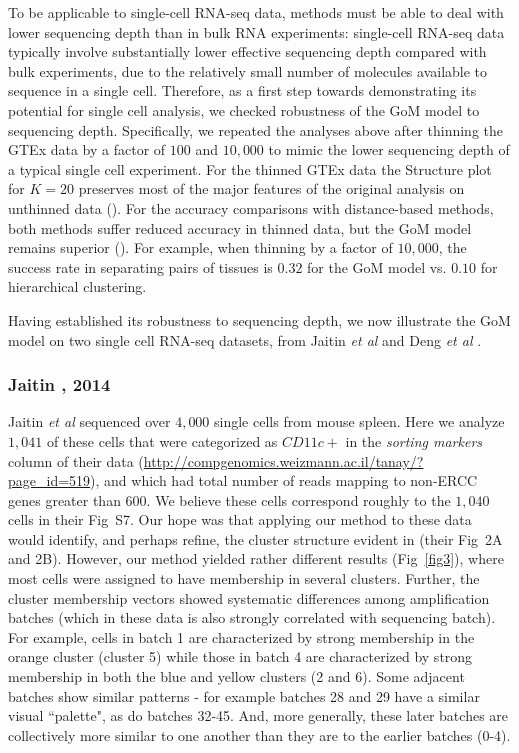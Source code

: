 \documentclass[10pt,letterpaper]{article}
\begin{document}
To be applicable to single-cell RNA-seq data, methods must be able to deal with lower sequencing depth than in bulk RNA experiments:
 single-cell RNA-seq data typically involve substantially lower effective sequencing depth compared with bulk experiments, due to the relatively small number of molecules available to sequence in a single cell. Therefore, as a first step towards demonstrating its potential for single cell analysis, we checked robustness of the GoM model to sequencing depth. Specifically,
we repeated the analyses above after thinning the GTEx data by a factor of $100$ and $10,000$ to mimic the lower sequencing depth of a typical single cell experiment. For the thinned GTEx data the Structure plot for $K=20$ preserves most of the major features of the original analysis on unthinned data (). For the accuracy comparisons with distance-based methods, both methods suffer reduced accuracy in thinned data, but the GoM model remains superior (). For example, when thinning by a factor of $10,000$, the success rate in separating pairs of tissues is $0.32$ for the GoM model vs. $0.10$ for hierarchical clustering.

Having established its robustness to sequencing depth, we now illustrate the GoM model on two single cell RNA-seq datasets, from Jaitin \textit{et al} \cite{Jaitin2014} and Deng \textit{et al} \cite{Deng2014}.


\subsubsection*{Jaitin , 2014}

Jaitin \textit{et al} sequenced over $4,000$ single cells from mouse spleen. Here we analyze $1,041$ of these cells that were categorized as $CD11c+$ in the \textit{sorting markers} column of their data (\url{http://compgenomics.weizmann.ac.il/tanay/?page_id=519}), and which had total number of reads mapping to non-ERCC genes greater than $600$. We believe these cells correspond roughly to the $1,040$ cells in their Fig~S7.   Our hope was that applying our method to these data would identify, and perhaps refine, the cluster structure evident in
\cite{Jaitin2014} (their Fig~2A and 2B). However, our method yielded rather different results (Fig~\ref{fig3}), where most cells were assigned to have membership in several clusters. Further, the cluster membership vectors showed systematic differences among amplification batches (which in these data is also strongly correlated with sequencing batch). For example, cells in batch 1 are characterized by strong membership in the orange cluster (cluster 5) while those in batch 4 are characterized
by strong membership in both the blue and yellow clusters (2 and 6). Some adjacent batches show similar patterns - for example batches 28 and 29 have a similar visual ``palette", as do batches 32-45. And, more generally, these later batches are collectively more similar to one another than they are to the earlier batches (0-4).
\end{document}
